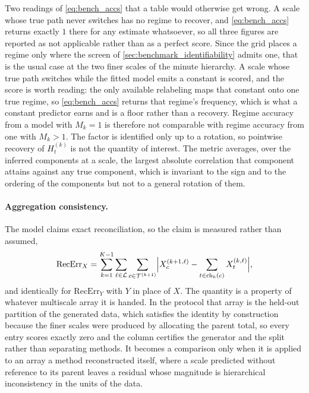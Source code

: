 Two readings of \eqref{eq:bench_accs} that a table would otherwise get wrong. A
scale whose true path never switches has no regime to recover, and
\eqref{eq:bench_accs} returns exactly \(1\) there for any estimate whatsoever, so
all three figures are reported as not applicable rather than as a perfect score.
Since the grid places a regime only where the screen of
\cref{sec:benchmark_identifiability} admits one, that is the usual case at the
two finer scales of the minute hierarchy. A scale whose true path switches while
the fitted model emits a constant is scored, and the score is worth reading: the
only available relabeling maps that constant onto one true regime, so
\eqref{eq:bench_accs} returns that regime's frequency, which is what a constant
predictor earns and is a floor rather than a recovery. Regime accuracy from a
model with \(M_k = 1\) is therefore not comparable with regime accuracy from one
with \(M_k > 1\). The factor is
identified only up to a rotation, so pointwise recovery of \(H_t^{(k)}\) is not
the quantity of interest. The metric averages, over the inferred components at
a scale, the largest absolute correlation that component attains against any
true component, which is invariant to the sign and to the ordering of the
components but not to a general rotation of them.

\paragraph{Aggregation consistency.}
The model claims exact reconciliation, so the claim is measured rather than
assumed,
\begin{align}
\mathrm{RecErr}_X
=
\sum_{k=1}^{K-1}\sum_{\ell \in {\mathcal{L}}}\sum_{c \in {\mathcal{T}}^{(k+1)}}
\Bigl| X_c^{(k+1,\ell)} - \sum_{t \in \operatorname{ch}_k(c)} X_t^{(k,\ell)} \Bigr|,
\label{eq:bench_recx}
\end{align}
and identically for \(\mathrm{RecErr}_Y\) with \(Y\) in place of \(X\). The
quantity is a property of whatever multiscale array it is handed. In the
protocol that array is the held-out partition of the generated data, which
satisfies the identity by construction because the finer scales were produced
by allocating the parent total, so every entry scores exactly zero and the
column certifies the generator and the split rather than separating methods.
It becomes a comparison only when it is applied to an array a method
reconstructed itself, where a scale predicted without reference to its parent
leaves a residual whose magnitude is hierarchical inconsistency in the units of
the data.

